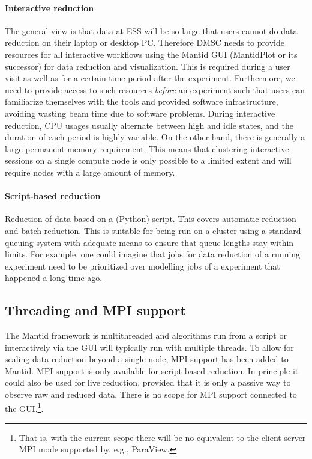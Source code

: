\documentclass[a4paper,english,numbers=noenddot,bibliography=totoc,chapterprefix=on,DIV=12]{scrartcl}
\newcommand{\mantid}{Mantid\xspace}
\begin{document}
\paragraph{Interactive reduction} 
The general view is that data at ESS will be so large that users cannot do data reduction on their laptop or desktop PC. Therefore DMSC needs to provide resources for all interactive workflows using the \mantid GUI (MantidPlot or its successor) for data reduction and visualization.
This is required during a user visit as well as for a certain time period after the experiment.
Furthermore, we need to provide access to such resources \emph{before} an experiment such that users can familiarize themselves with the tools and provided software infrastructure, avoiding wasting beam time due to software problems.
During interactive reduction, CPU usages usually alternate between high and idle states, and the duration of each period is highly variable.
On the other hand, there is generally a large permanent memory requirement.
This means that clustering interactive sessions on a single compute node is only possible to a limited extent and will require nodes with a large amount of memory.

\paragraph{Script-based reduction}
Reduction of data based on a (Python) script.
This covers automatic reduction and batch reduction.
This is suitable for being run on a cluster using a standard queuing system with adequate means to ensure that queue lengths stay within limits.
For example, one could imagine that jobs for data reduction of a running experiment need to be prioritized over modelling jobs of a experiment that happened a long time ago.


\subsection{Threading and MPI support}
\label{sec:threading-and-mpi-support}

The \mantid framework is multithreaded and algorithms run from a script or interactively via the GUI will typically run with multiple threads.
To allow for scaling data reduction beyond a single node, MPI support has been added to \mantid.
MPI support is only available for script-based reduction.
In principle it could also be used for live reduction, provided that it is only a passive way to observe raw and reduced data.
There is no scope for MPI support connected to the GUI.\footnote{That is, with the current scope there will be no equivalent to the client-server MPI mode supported by, e.g., ParaView.}.
\end{document}
